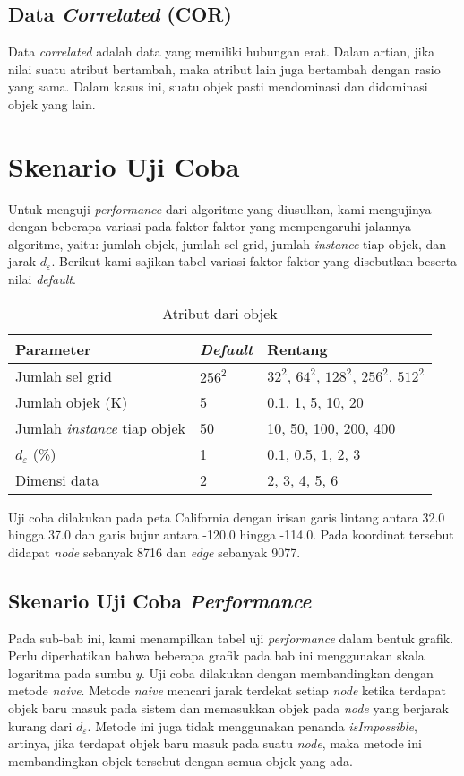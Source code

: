 \subsection{Data \textit{Correlated} (COR)}
\tab Data \textit{correlated} adalah data yang memiliki hubungan erat. Dalam artian, jika nilai suatu atribut bertambah, maka atribut lain juga bertambah dengan rasio yang sama. Dalam kasus ini, suatu objek pasti mendominasi dan didominasi objek yang lain.

\section{Skenario Uji Coba} \label{skenarioujicoba}

\tab Untuk menguji \textit{performance} dari algoritme yang diusulkan, kami mengujinya dengan beberapa variasi pada faktor-faktor yang mempengaruhi jalannya algoritme, yaitu: jumlah objek, jumlah sel grid, jumlah \textit{instance} tiap objek, dan jarak $ d_\varepsilon $. Berikut kami sajikan tabel variasi faktor-faktor yang disebutkan beserta nilai \textit{default}.

\begin{table}[H]
	\centering
	\begin{tabular}{| l | l | l |}
		\hline
		\textbf{Parameter} & \textbf{\textit{Default}} & \textbf {Rentang} \\ \hline
		Jumlah sel grid & $ 256^2 $ & $ 32^2 $, $ 64^2 $, $ 128^2 $, $ 256^2 $, $ 512^2 $ \\ \hline
		Jumlah objek (K) & 5 & 0.1, 1, 5, 10, 20 \\ \hline
		Jumlah \textit{instance} tiap objek & 50 & 10, 50, 100, 200, 400 \\ \hline
		$ d_\varepsilon $ (\%) & 1 & 0.1, 0.5, 1, 2, 3 \\ \hline
		Dimensi data & 2 & 2, 3, 4, 5, 6 \\ \hline
	\end{tabular}
	\caption{Atribut dari objek
		\label{tab:uji}}
\end{table}

\tab Uji coba dilakukan pada peta California\cite{ontrip} dengan irisan garis lintang antara 32.0 hingga 37.0 dan garis bujur antara -120.0 hingga -114.0. Pada koordinat tersebut didapat \textit{node} sebanyak 8716 dan \textit{edge} sebanyak 9077.

\subsection{Skenario Uji Coba \textit{Performance}}
\tab Pada sub-bab ini, kami menampilkan tabel uji \textit{performance} dalam bentuk grafik. Perlu diperhatikan bahwa beberapa grafik pada bab ini menggunakan skala logaritma pada sumbu \textit{y}. Uji coba dilakukan dengan membandingkan dengan metode \textit{naive}. Metode \textit{naive} mencari jarak terdekat setiap \textit{node} ketika terdapat objek baru masuk pada sistem dan memasukkan objek pada \textit{node} yang berjarak kurang dari $ d_\varepsilon $. Metode ini juga tidak menggunakan penanda \textit{isImpossible}, artinya, jika terdapat objek baru masuk pada suatu \textit{node}, maka metode ini membandingkan objek tersebut dengan semua objek yang ada.

